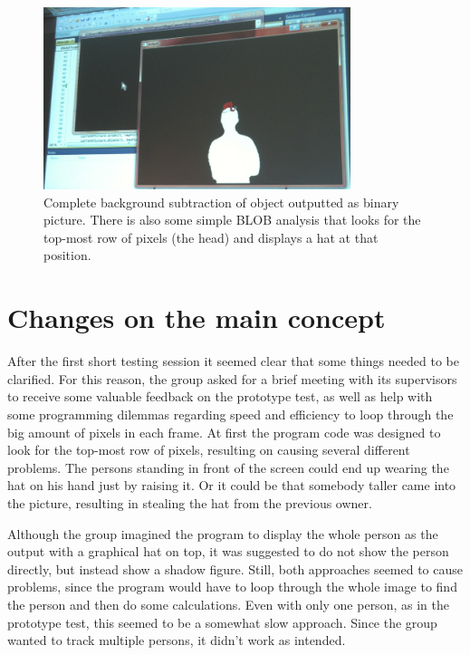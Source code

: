 \begin{figure}[htbp]
\centering
\includegraphics[width=0.80\textwidth]{Pictures/Test/MaxSubtracted.jpg}
\caption{Complete background subtraction of object outputted as binary picture. There is also some simple BLOB analysis that looks for the top-most row of pixels (the head) and displays a hat at that position.}
\label{fig:max_subtracted}
\end{figure}

\section{Changes on the main concept}
After the first short testing session it seemed clear that some things needed to be clarified. For this reason, the group asked for a brief meeting with its supervisors to receive some valuable feedback on the prototype test, as well as help with some programming dilemmas regarding speed and efficiency to loop through the big amount of pixels in each frame. At first the program code was designed to look for the top-most row of pixels, resulting on causing several different problems. The persons standing in front of the screen could end up wearing the hat on his hand just by raising it. Or it could be that somebody taller came into the picture, resulting in stealing the hat from the previous owner.

Although the group imagined the program to display the whole person as the output with a graphical hat on top, it was suggested to do not show the person directly, but instead show a shadow figure. Still, both approaches seemed to cause problems, since the program would have to loop through the whole image to find the person and then do some calculations. Even with only one person, as in the prototype test, this seemed to be a somewhat slow approach. Since the group wanted to track multiple persons, it didn't work as intended.

